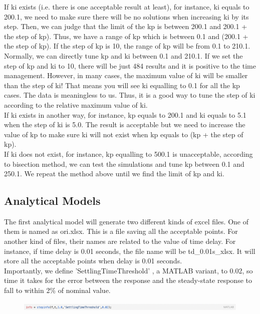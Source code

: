 \documentclass{report}
\begin{document}
If ki exists (i.e. there is one acceptable result at least), for instance, ki equals to 200.1, we need to make sure there will be no solutions when increasing ki by its step. Then, we can judge that the limit of the kp is between 200.1 and  200.1 + the step of kp). Thus, we have a range of kp which is between 0.1 and (200.1 + the step of kp). If the step of kp is 10, the range of kp will be from 0.1 to 210.1. Normally, we can directly tune kp and ki between 0.1 and 210.1. If we set the step of kp and ki to 10, there will be just 484 results and it is positive to the time management. However, in many cases, the maximum value of ki will be smaller than the step of ki! That means you will see ki equalling to 0.1 for all the kp cases. The data is meaningless to us. Thus, it is a good way to tune the step of ki according to the relative maximum value of ki.\\

If ki exists in another way, for instance, kp equals to 200.1 and ki equals to 5.1 when the step of ki is 5.0. The result is acceptable but we need to increase the value of kp to make sure ki will not exist when kp equals to (kp + the step of kp).\\

If ki does not exist, for instance, kp equalling to 500.1 is unacceptable, according to bisection method, we can test the simulations and tune kp between 0.1 and 250.1. We repeat the method above until we find the limit of kp and ki.\\


\subsection{Analytical Models} %
The first analytical model will generate two different kinds of excel files. One of them is named as ori.xlsx. This is a file saving all the acceptable points. For another kind of files, their names are related to the value of time delay. For instance, if time delay is 0.01 seconds, the file name will be td\_0.01s\_xlsx. It will store all the acceptable points when delay is 0.01 seconds.\\

Importantly, we define 'SettlingTimeThreshold' , a MATLAB variant, to 0.02, so time it takes for the error between the response and the steady-state response to fall to within 2\% of nominal value.\\

\begin{figure}[htbp]
\centering
\includegraphics[width = \textwidth]{figure/3_4_2_code4.png}
\label{3_4_2_code4}
\end{figure}
\end{document}
